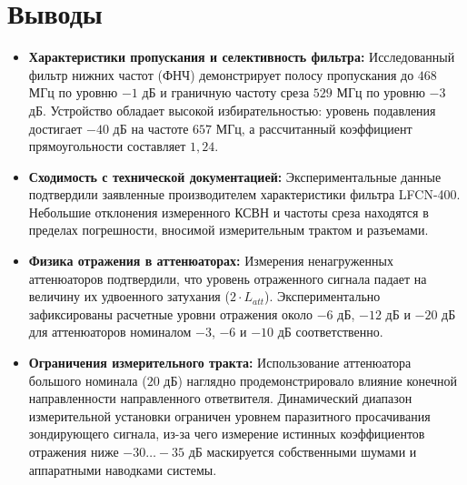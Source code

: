 \section{Выводы}

\begin{itemize}
    \item \textbf{Характеристики пропускания и селективность фильтра:} Исследованный фильтр нижних частот (ФНЧ) демонстрирует полосу пропускания до $468$ МГц по уровню $-1$ дБ и граничную частоту среза $529$ МГц по уровню $-3$ дБ. Устройство обладает высокой избирательностью: уровень подавления достигает $-40$ дБ на частоте $657$ МГц, а рассчитанный коэффициент прямоугольности составляет $1{,}24$.
	\item \textbf{Сходимость с технической документацией:} Экспериментальные данные подтвердили заявленные производителем характеристики фильтра LFCN-400. Небольшие отклонения измеренного КСВН и частоты среза находятся в пределах погрешности, вносимой измерительным трактом и разъемами.    
    \item \textbf{Физика отражения в аттенюаторах:} Измерения ненагруженных аттенюаторов подтвердили, что уровень отраженного сигнала падает на величину их удвоенного затухания ($2 \cdot L_{att}$). Экспериментально зафиксированы расчетные уровни отражения около $-6$ дБ, $-12$ дБ и $-20$ дБ для аттенюаторов номиналом $-3$, $-6$ и $-10$ дБ соответственно.
    \item \textbf{Ограничения измерительного тракта:} Использование аттенюатора большого номинала ($20$ дБ) наглядно продемонстрировало влияние конечной направленности направленного ответвителя. Динамический диапазон измерительной установки ограничен уровнем паразитного просачивания зондирующего сигнала, из-за чего измерение истинных коэффициентов отражения ниже $-30 \dots -35$ дБ маскируется собственными шумами и аппаратными наводками системы.
\end{itemize}
